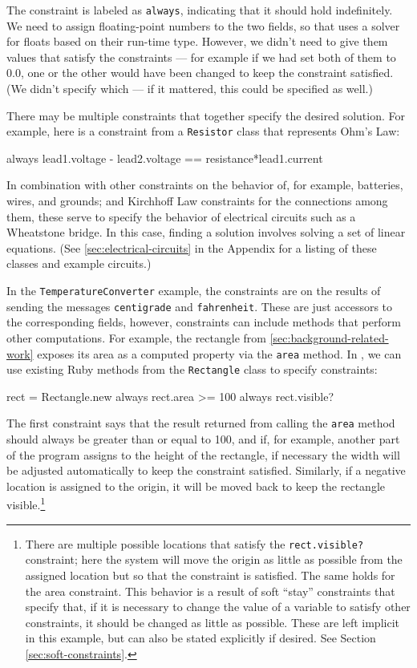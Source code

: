 The constraint is labeled as \lstinline{always}, indicating that it
should hold indefinitely.  We need to assign floating-point numbers to
the two fields, so that \toolname uses a solver for floats based on
their run-time type. However, we didn't need to give them values that
satisfy the constraints --- for example if we had set both of them to
0.0, one or the other would have been changed to keep the constraint
satisfied.  (We didn't specify which --- if it mattered, this could be
specified as well.)

There may be multiple constraints that together specify the desired
solution.  For example, here is a constraint from a
\lstinline{Resistor} class that represents Ohm's Law:

\begin{code}
  always { lead1.voltage - lead2.voltage == resistance*lead1.current }
\end{code}

In combination with other constraints on the behavior of, for example,
batteries, wires, and grounds; and Kirchhoff Law constraints for the
connections among them, these serve to specify the behavior of
electrical circuits such as a Wheatstone bridge.  In this case,
finding a solution involves solving a set of linear equations.  (See
\autoref{sec:electrical-circuits} in the Appendix for a listing of
these classes and example circuits.)

In the \lstinline{TemperatureConverter} example, the constraints are
on the results of sending the messages \lstinline{centigrade} and
\lstinline{fahrenheit}. These are just accessors to the corresponding
fields, however, constraints can include methods that perform other
computations. For example, the rectangle from
\autoref{sec:background-related-work} exposes its area as a computed
property via the \lstinline{area} method. In \toolname, we can use
existing Ruby methods from the \lstinline{Rectangle} class to specify
constraints:

\begin{code}
rect = Rectangle.new
always { rect.area >= 100 }
always { rect.visible? }
\end{code}

The first constraint says that the result returned from calling the
\lstinline{area} method should always be greater than or equal to 100,
and if, for example, another part of the program assigns to the height
of the rectangle, if necessary the width will be adjusted
automatically to keep the constraint satisfied.  Similarly, if a
negative location is assigned to the origin, it will be moved back to
keep the rectangle visible.\footnote{There are multiple possible
  locations that satisfy the \lstinline{rect.visible?} constraint;
  here the system will move the origin as little as possible from the
  assigned location but so that the constraint is satisfied.  The same
  holds for the area constraint.  This behavior is a result of soft
  ``stay'' constraints that specify that, if it is necessary to change
  the value of a variable to satisfy other constraints, it should be
  changed as little as possible.  These are left implicit in this
  example, but can also be stated explicitly if desired.  See Section
  \ref{sec:soft-constraints}.}

